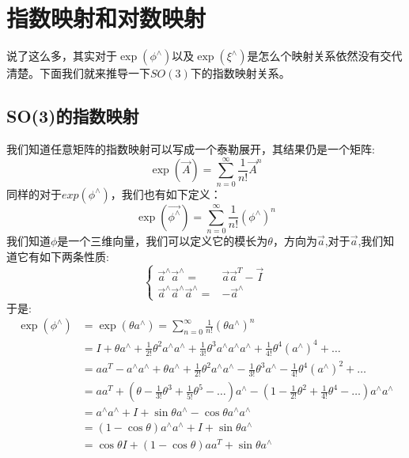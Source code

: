 \section{指数映射和对数映射}
说了这么多，其实对于$\exp(\phi^\wedge)$以及$\exp(\xi^\wedge)$是怎么个映射关系依然没有交代清楚。下面我们就来推导一下$SO(3)$下的指数映射关系。
\subsection{SO(3)的指数映射}
我们知道任意矩阵的指数映射可以写成一个泰勒展开，其结果仍是一个矩阵:
\begin{equation}
	\exp(\vec{A})=\sum_{n=0}^{\infty}\frac{1}{n!}\vec{A}^n
\end{equation}
同样的对于$exp(\phi^\wedge)$，我们也有如下定义：
\begin{equation}
\exp(\vec{\phi^\wedge})=\sum_{n=0}^{\infty}\frac{1}{n!}(\phi^\wedge)^n
\end{equation}
我们知道$\phi$是一个三维向量，我们可以定义它的模长为$\theta$，方向为$\vec{a}$,对于$\vec{a}$,我们知道它有如下两条性质:
\begin{equation}
\left\{\begin{aligned}
	\vec{a}^\wedge\vec{a}^\wedge=&\vec{a}\vec{a}^T-\vec{I}\\
\vec{a}^\wedge\vec{a}^\wedge\vec{a}^\wedge=&-\vec{a}^\wedge
\end{aligned}\right.
\end{equation}
于是:
\begin{equation*}
\begin{aligned} 
\exp \left(\phi^{\wedge}\right) &=\exp \left(\theta a^{\wedge}\right)=\sum_{n=0}^{\infty} \frac{1}{n !}\left(\theta a^{\wedge}\right)^{n} \\
&=I+\theta a^{\wedge}+\frac{1}{2 !} \theta^{2} a^{\wedge} a^{\wedge}+\frac{1}{3 !} \theta^{3} a^{\wedge} a^{\wedge} a^{\wedge}+\frac{1}{4 !} \theta^{4}\left(a^{\wedge}\right)^{4}+\ldots\\
&=a a^{T}-a^{\wedge} a^{\wedge}+\theta a^{\wedge}+\frac{1}{2 !} \theta^{2} a^{\wedge} a^{\wedge}-\frac{1}{3 !} \theta^{3} a^{\wedge}-\frac{1}{4 !} \theta^{4}\left(a^{\wedge}\right)^{2}+\ldots \\ 
&=a a^{T}+\left(\theta-\frac{1}{3 !} \theta^{3}+\frac{1}{5 !} \theta^{5}-\dots\right) a^{\wedge}-\left(1-\frac{1}{2 !} \theta^{2}+\frac{1}{4 !} \theta^{4}-\ldots\right) a^{\wedge} a^{\wedge}\\
&=a^{\wedge} a^{\wedge}+I+\sin \theta a^{\wedge}-\cos \theta a^{\wedge} a^{\wedge}\\
&=(1-\cos \theta) a^{\wedge} a^{\wedge}+I+\sin \theta a^{\wedge} \\
&=\cos \theta I+(1-\cos \theta) a a^{T}+\sin \theta a^{\wedge}
\end{aligned}
\end{equation*}

